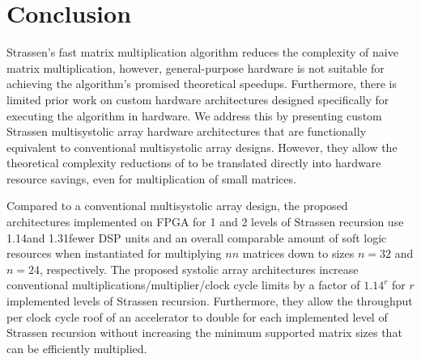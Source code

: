 \section{Conclusion}
Strassen's fast matrix multiplication algorithm reduces the complexity of naive matrix multiplication, however, general-purpose hardware is not suitable for achieving the algorithm's promised theoretical speedups.
Furthermore, there is limited prior work on custom hardware architectures designed specifically for executing the algorithm in hardware.
We address this by presenting custom Strassen multisystolic array hardware architectures that are functionally equivalent to conventional multisystolic array designs.
However, they allow the theoretical complexity reductions of \sa to be translated directly into hardware resource savings, even for multiplication of small matrices.

Compared to a conventional multisystolic array design, the proposed architectures implemented on FPGA for 1 and 2 levels of Strassen recursion use 1.14\x and 1.31\x fewer DSP units and an overall comparable amount of soft logic resources when instantiated for multiplying $n$\by$n$ matrices down to sizes $n = 32$ and $n = 24$, respectively.
The proposed systolic array architectures increase conventional multiplications/multiplier/clock cycle limits by a factor of $1.14^r$ for $r$ implemented levels of Strassen recursion.
Furthermore, they allow the throughput per clock cycle roof of an accelerator to double for each implemented level of Strassen recursion without increasing the minimum supported matrix sizes that can be efficiently multiplied.
